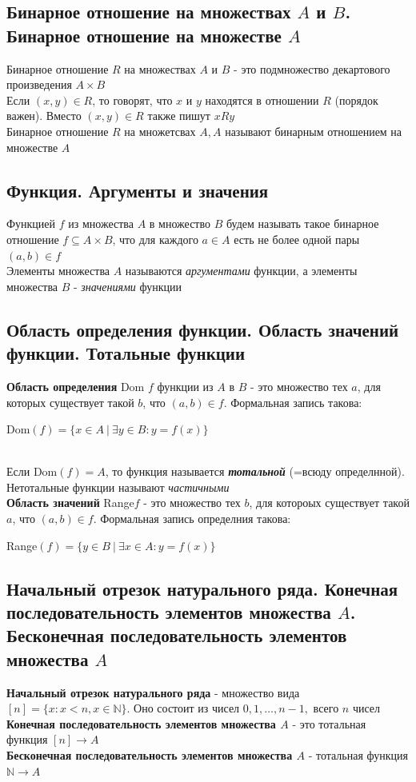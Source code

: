 \documentclass[a4paper]{article}
\begin{document}
\subsection{Бинарное отношение на множествах $A$ и $B$. Бинарное отношение на множестве $A$}
Бинарное отношение $R$ на множествах $A$ и $B$ - это подмножество декартового произведения $A\times B$\\[2mm]
\indent Если $(x,y)\in R$, то говорят, что $x$ и $y$ находятся в отношении $R$ (порядок важен). Вместо $(x,y)\in R$ также пишут $xRy$\\[2mm]
\indent Бинарное отношение $R$ на множетсвах $A, A$ называют бинарным отношением на множестве $A$
\subsection{Функция. Аргументы и значения}
Функцией $f$ из множества $A$ в множество $B$ будем называть такое бинарное отношение $f\subseteq A\times B$, что для каждого $a\in A$ есть не более одной пары $(a, b)\in f$\\[2mm]
\indent Элементы множества $A$ называются \textit{аргументами} функции, а элементы множества $B$ - \textit{значениями} функции
\subsection{Область определения функции. Область значений функции. Тотальные функции}
\textbf{Область определения} Dom $f$ функции из $A$ в $B$ - это множество тех $a$, для которых существует такой $b$, что $(a, b)\in f$. Формальная запись такова:\\[2mm]
\centerline{Dom$(f)=\{x\in A\ |\ \exists y\in B: y=f(x)\}$}\\[2mm]
\indent Если Dom$(f)=A$, то функция называется \textit{\textbf{тотальной}} (=всюду определнной). Нетотальные функции называют \textit{частичными}\\[2mm]
\indent \textbf{Область значений} Range$f$ - это множество тех $b$, для котороых существует такой $a$, что $(a, b)\in f$. Формальная запись определния такова:\\[2mm]
\centerline{Range$(f)=\{y\in B\ |\ \exists x\in A: y=f(x)\}$}
\subsection{Начальный отрезок натурального ряда. Конечная последовательность элементов множества $A$. Бесконечная последовательность элементов множества $A$}
\textbf{Начальный отрезок натурального ряда} - множество вида $[n]=\{x: x<n, x\in\mathbb{N}\}$. Оно состоит из чисел $0, 1, \ldots, n-1,$ всего $n$ чисел\\[2mm]
\indent \textbf{Конечная последовательность элементов множества $A$} - это тотальная функция $[n]\rightarrow A$\\[2mm]
\indent \textbf{Бесконечная последовательность элементов множества $A$} - тотальная функция $\mathbb{N}\rightarrow A$
\end{document}
